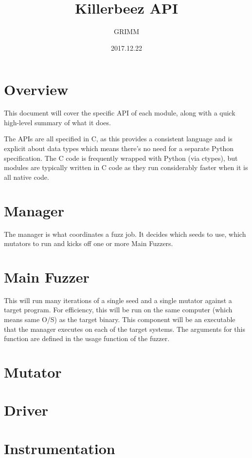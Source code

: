 \documentclass{article}
\title{Killerbeez API}
\author{GRIMM}
\date{2017.12.22}
\begin{document}
\thispagestyle{empty}
\maketitle
\newpage

\tableofcontents
\newpage

\section{Overview}
This document will cover the specific API of each module, along with a quick
high-level summary of what it does.

\par
The APIs are all specified in C, as this provides a consistent language and is
explicit about data types which means there's no need for a separate Python
specification.  The C code is frequently wrapped with Python (via ctypes), but
modules are typically written in C code as they run considerably faster when
it is all native code.

\section{Manager}
The manager is what coordinates a fuzz job.  It decides which seeds to use,
which mutators to run and kicks off one or more Main Fuzzers.

\section{Main Fuzzer}
This will run many iterations of a single seed and a single mutator against a
target program.  For efficiency, this will be run on the same computer (which
means same O/S) as the target binary.  This component will be an executable that
the manager executes on each of the target systems.  The arguments for this
function are defined in the usage function of the fuzzer.

\section{Mutator}
\label{mutator}


\section{Driver}
\label{driver}


\section{Instrumentation}
\label{instrumentation}




\end{document}
